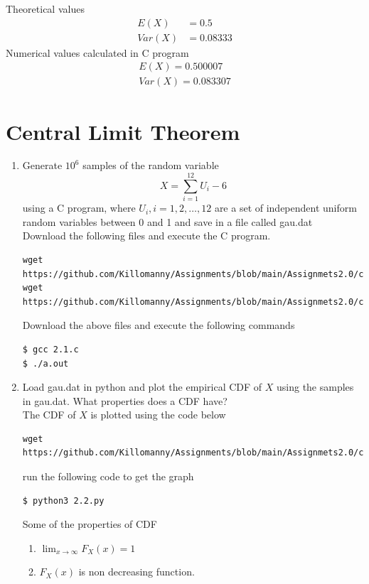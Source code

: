 \documentclass[journal,12pt,twocolumn]{IEEEtran}
\renewcommand\thesection{\arabic{section}}
\begin{document}
Theoretical values 
\begin{align}
E(X) &= 0.5 \\
Var(X) &= 0.08333
\end{align}
Numerical values calculated in C program
\begin{align}
E(X) = 0.500007\\
Var(X) = 0.083307
\end{align}

\section{Central Limit Theorem}
%
\begin{enumerate}[label=\thesection.\arabic*
,ref=\thesection.\theenumi]
%
\item
Generate $10^6$ samples of the random variable
%
\begin{equation}
X = \sum_{i=1}^{12}U_i -6
\end{equation}
%
using a C program, where $U_i, i = 1,2,\dots, 12$ are  a set of independent uniform random variables between 0 and 1 and save in a file called gau.dat\\
\solution Download the following files and execute the  C program.
\begin{lstlisting}
wget https://github.com/Killomanny/Assignments/blob/main/Assignmets2.0/codes/2.1.c
wget https://github.com/Killomanny/Assignments/blob/main/Assignmets2.0/codes/source.h
\end{lstlisting}
Download the above files and execute the following commands
\begin{lstlisting}
$ gcc 2.1.c
$ ./a.out
\end{lstlisting}
\item
Load gau.dat in python and plot the empirical CDF of $X$ using the samples in gau.dat. What properties does a CDF have?\\
\solution The CDF of $X$ is plotted using the code below
\begin{lstlisting}
wget https://github.com/Killomanny/Assignments/blob/main/Assignmets2.0/codes/2.2.py
\end{lstlisting}
run the following code to get the graph
\begin{lstlisting}
$ python3 2.2.py
\end{lstlisting}
Some of the properties of CDF 
\begin{enumerate}
\item $\lim_{x \to \infty}F_X(x) = 1$
    \item $F_X(x)$ is non decreasing function.

\end{enumerate}
\end{enumerate}
\end{document}
